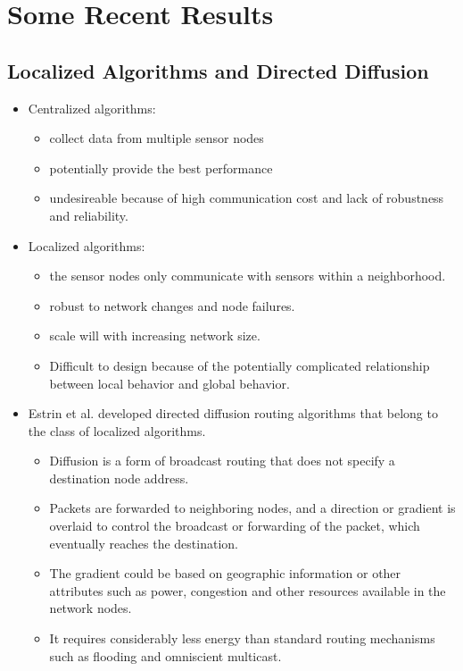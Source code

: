 \documentclass[letterpaper,10pt]{article}
\begin{document}
\section{Some Recent Results}

\subsection{Localized Algorithms and Directed Diffusion}

\begin{itemize}
	\item Centralized algorithms:
	\begin{itemize}
		\item collect data from multiple sensor nodes
		\item potentially provide the best performance
		\item undesireable because of high communication cost and lack of robustness and reliability.
	\end{itemize}
	\item Localized algorithms:
	\begin{itemize}
		\item the sensor nodes only communicate with sensors within a neighborhood.
		\item robust to network changes and node failures.
		\item scale will with increasing network size.
		\item Difficult to design because of the potentially complicated relationship between local behavior and global behavior.
	\end{itemize}
	\item Estrin et al. developed directed diffusion routing algorithms that belong to the class of localized algorithms.
	\begin{itemize}
		\item Diffusion is a form of broadcast routing that does not specify a destination node address.
		\item Packets are forwarded to neighboring nodes, and a direction or gradient is overlaid to control the broadcast or forwarding of the packet, which eventually reaches the destination.
		\item The gradient could be based on geographic information or other attributes such as power, congestion and other resources available in the network nodes.
		\item It requires considerably less energy than standard routing mechanisms such as flooding and omniscient multicast.
	\end{itemize}
\end{itemize}
\end{document}
